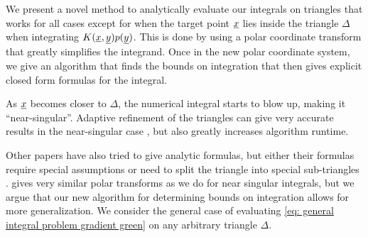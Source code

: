 \documentclass[../paper.tex]{subfiles}
\begin{document}
We present a novel method to analytically evaluate our integrals on triangles that works for all cases except for when the target point $\underline{x}$ 
lies inside the triangle $\Delta$ when integrating $K(\underline{x}, \underline{y})p(\underline{y})$. This is done by using a polar coordinate transform that greatly simplifies the integrand. Once in the new polar coordinate system, we give an algorithm that finds the bounds on integration that then gives explicit closed form formulas for the integral. 

As $\underline{x}$ becomes closer to $\Delta$, the numerical integral starts to blow up, making it ``near-singular''. Adaptive refinement of the triangles can give very accurate results in the near-singular case \cite{atkinson1997numerical}, but also greatly increases algorithm runtime. 

Other papers have also tried to give analytic formulas, but either their formulas require special assumptions or need to split the triangle into special sub-triangles \cite{carley2013analytical, okon1982potentialLinear, bohm2024efficient}. \cite{graglia1993numerical} gives very similar polar transforms as we do for near singular integrals, but we argue that our new algorithm for determining bounds on integration allows for more generalization. 
We consider the general case of evaluating \autoref{eq: general integral problem gradient green} on any arbitrary triangle $\Delta$. 
\end{document}
